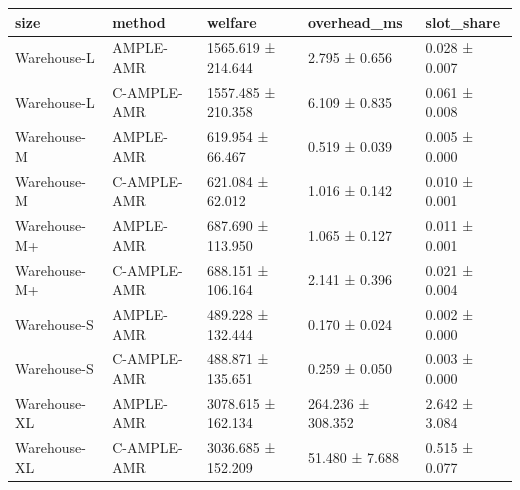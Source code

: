 \begin{tabular}{lllll}
\toprule
size & method & welfare & overhead\_ms & slot\_share \\
\midrule
Warehouse-L & AMPLE-AMR & 1565.619 ± 214.644 & 2.795 ± 0.656 & 0.028 ± 0.007 \\
Warehouse-L & C-AMPLE-AMR & 1557.485 ± 210.358 & 6.109 ± 0.835 & 0.061 ± 0.008 \\
Warehouse-M & AMPLE-AMR & 619.954 ± 66.467 & 0.519 ± 0.039 & 0.005 ± 0.000 \\
Warehouse-M & C-AMPLE-AMR & 621.084 ± 62.012 & 1.016 ± 0.142 & 0.010 ± 0.001 \\
Warehouse-M+ & AMPLE-AMR & 687.690 ± 113.950 & 1.065 ± 0.127 & 0.011 ± 0.001 \\
Warehouse-M+ & C-AMPLE-AMR & 688.151 ± 106.164 & 2.141 ± 0.396 & 0.021 ± 0.004 \\
Warehouse-S & AMPLE-AMR & 489.228 ± 132.444 & 0.170 ± 0.024 & 0.002 ± 0.000 \\
Warehouse-S & C-AMPLE-AMR & 488.871 ± 135.651 & 0.259 ± 0.050 & 0.003 ± 0.000 \\
Warehouse-XL & AMPLE-AMR & 3078.615 ± 162.134 & 264.236 ± 308.352 & 2.642 ± 3.084 \\
Warehouse-XL & C-AMPLE-AMR & 3036.685 ± 152.209 & 51.480 ± 7.688 & 0.515 ± 0.077 \\
\bottomrule
\end{tabular}
